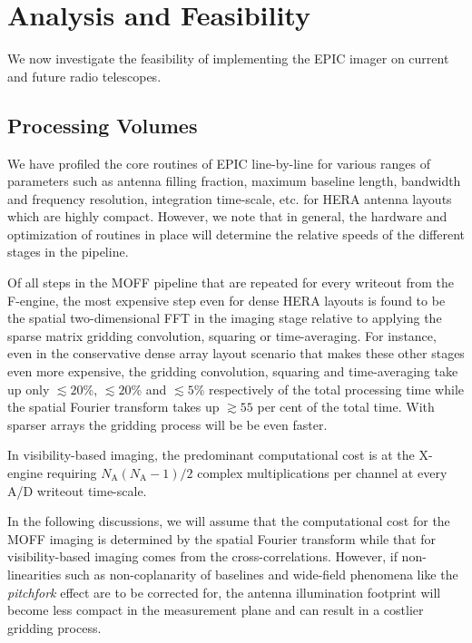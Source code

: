 \documentclass[a4paper,fleqn,usenatbib]{mnras}
\newcommand{\Nant}{N_\textrm{A}}
\begin{document}
\section{Analysis and Feasibility}\label{sec:analysis}

We now investigate the feasibility of implementing the EPIC imager on current
and future radio telescopes. 

\subsection{Processing Volumes}

We have profiled the core routines of EPIC line-by-line for various ranges of 
parameters such as antenna filling fraction, maximum baseline length, bandwidth 
and frequency resolution, integration time-scale, etc. for HERA antenna layouts 
which are highly compact. However, we note that in general, the hardware and 
optimization of routines in place will determine the relative speeds of the 
different stages in the pipeline. 

Of all steps in the MOFF pipeline that are repeated for every writeout from 
the F-engine, the most expensive step even for dense HERA layouts is found to be 
the spatial two-dimensional FFT in the imaging stage relative to applying the 
sparse matrix gridding convolution, squaring or time-averaging. For instance, 
even in the conservative dense array layout scenario that makes these other 
stages even more expensive, the gridding convolution, squaring and time-averaging 
take up only $\lesssim 20$\%, $\lesssim 20$\% and $\lesssim 5$\% respectively 
of the total processing time while the spatial Fourier transform takes up 
$\gtrsim 55$ per cent of the total time. With sparser arrays the gridding process 
will be be even faster. 

In visibility-based imaging, the predominant computational cost is at the 
X-engine requiring $\Nant(\Nant-1)/2$ complex multiplications per channel at 
every A/D writeout time-scale. 

In the following discussions, we will assume that the computational cost for the MOFF imaging is determined by the spatial Fourier transform while that for visibility-based imaging comes from the cross-correlations. However, if non-linearities such as non-coplanarity of baselines \citep{cor08} and wide-field phenomena like the {\it pitchfork} effect \citep{thy15a,thy15b} are to be corrected for, the antenna illumination footprint will become less compact in the measurement plane and can result in a costlier gridding process.
\end{document}
